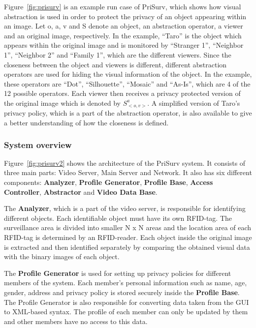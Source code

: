 \documentclass[conference]{IEEEtran}
\begin{document}
Figure~\ref{fig:prisurv} is an example run case of PriSurv, which shows how visual abstraction is used in order to protect the privacy of an object appearing within an image. Let o, a, v and S denote an object, an abstraction operator, a viewer and an original image, respectively. In the example, “Taro” is the object which appears within the original image and is monitored by “Stranger 1”, “Neighbor 1”, “Neighbor 2” and “Family 1”, which are the different viewers. Since the closeness between the object and viewers is different, different abstraction operators are used for hiding the visual information of the object. In the example, these operators are “Dot”, “Silhouette”, “Mosaic” and “As-Is”, which are 4 of the 12 possible operators. Each viewer then receives a privacy protected version of the original image which is denoted by $S_{<o, v>}^a$. A simplified version of Taro’s privacy policy, which is a part of the abstraction operator, is also available to give a better understanding of how the closeness is defined. 

\subsubsection{System overview}

Figure~\ref{fig:prisurv2} shows the architecture of the PriSurv system. It consists of three main parts: Video Server, Main Server and Network. It also has six different components: \textbf{Analyzer}, \textbf{Profile Generator}, \textbf{Profile Base}, \textbf{Access Controller}, \textbf{Abstractor} and \textbf{Video Data Base}. 

The \textbf{Analyzer}, which is a part of the video server, is responsible for identifying different objects. Each identifiable object must have its own \ac{RFID}-tag. The surveillance area is divided into smaller N x N areas and the location area of each \ac{RFID}-tag is determined by an \ac{RFID}-reader. Each object inside the original image is extracted and then identified separately by comparing the obtained visual data with the binary images of each object. 

The \textbf{Profile Generator} is used for setting up privacy policies for different members of the system. Each member's personal information such as name, age, gender, address and privacy policy is stored securely inside the \textbf{Profile Base}. The Profile Generator is also responsible for converting data taken from the GUI to \ac{XML}-based syntax. The profile of each member can only be updated by them and other members have no access to this data. 
\end{document}
